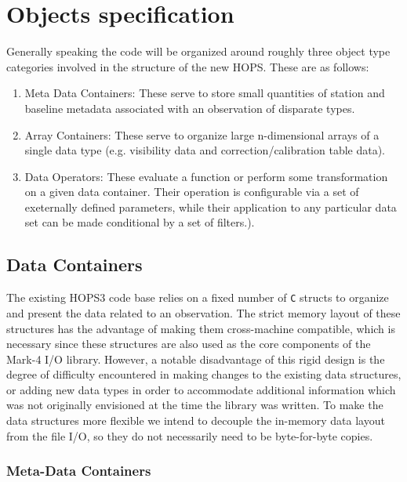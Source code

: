 \documentclass[hidelinks]{article}
\let\Oldsection\section
\renewcommand{\section}{\FloatBarrier\Oldsection}
\let\Oldsubsection\subsection
\renewcommand{\subsection}{\FloatBarrier\Oldsubsection}
\let\Oldsubsubsection\subsubsection
\renewcommand{\subsubsection}{\FloatBarrier\Oldsubsubsection}
\begin{document}
\section{Objects specification}

\label{sec:objects}


Generally speaking the code will be organized around roughly three object type categories involved in the structure of the new HOPS. These are as follows:

\begin{enumerate}
 \item Meta Data Containers: These serve to store small quantities of station and baseline metadata associated with an observation of disparate types.
 \item Array Containers: These serve to organize large n-dimensional arrays of a single data type (e.g. visibility data and correction/calibration table data). 
 \item Data Operators: These evaluate a function or perform some transformation on a given data container. Their operation is configurable via a set of exeternally defined parameters, while their application to any particular data set can be made conditional by a set of filters.).
\end{enumerate}

\subsection{Data Containers}

The existing HOPS3 code base relies on a fixed number of \texttt{C} structs to organize and present the data related to an observation. The strict memory layout of these structures has the advantage of making them cross-machine compatible, which is necessary since these structures are also used as the core components of the Mark-4 I/O library. However, a notable disadvantage of this rigid design is the degree of difficulty encountered in making changes to the existing data structures, or adding new data types in order to accommodate additional information which was not originally envisioned at the time the library was written. To make the data structures more flexible we intend to decouple the in-memory data layout from the file I/O, so they do not necessarily need to be byte-for-byte copies.

\subsubsection{Meta-Data Containers}
\end{document}
